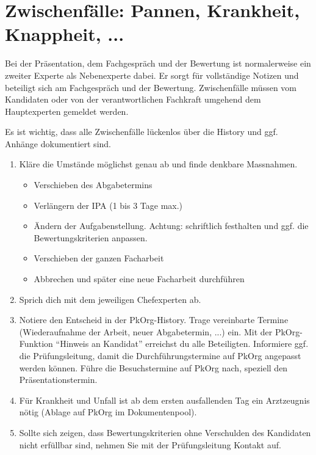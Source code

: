 \chapter{Zwischenfälle: Pannen, Krankheit, Knappheit, ...}
Bei der Präsentation, dem Fachgespräch und der Bewertung ist normalerweise ein zweiter Experte als Nebenexperte dabei. Er sorgt für vollständige Notizen und beteiligt sich am Fachgespräch und der Bewertung. Zwischenfälle müssen vom Kandidaten oder von der verantwortlichen Fachkraft umgehend dem Hauptexperten gemeldet werden.

Es ist wichtig, dass alle Zwischenfälle lückenlos über die History und ggf. Anhänge dokumentiert sind.

\begin{enumerate}
  \item Kläre die Umstände möglichst genau ab und finde denkbare Massnahmen.
  \begin{itemize}
    \item Verschieben des Abgabetermins
    \item Verlängern der IPA (1 bis 3 Tage max.)
    \item Ändern der Aufgabenstellung. Achtung: schriftlich festhalten und ggf. die Bewertungskriterien anpassen.
    \item Verschieben der ganzen Facharbeit
    \item Abbrechen und später eine neue Facharbeit durchführen
  \end{itemize}
  \item Sprich dich mit dem jeweiligen Chefexperten ab.
  \item Notiere den Entscheid in der PkOrg-History. Trage vereinbarte Termine (Wiederaufnahme der Arbeit, neuer Abgabetermin, ...) ein. Mit der PkOrg-Funktion \enquote{Hinweis an Kandidat} erreichst du alle Beteiligten.
  Informiere ggf. die Prüfungsleitung, damit die Durchführungstermine auf PkOrg
  angepasst werden können. Führe die Besuchstermine auf PkOrg nach, speziell den Präsentationstermin.
  \item Für Krankheit und Unfall ist ab dem ersten ausfallenden Tag ein Arztzeugnis nötig (Ablage auf PkOrg im Dokumentenpool).
  \item Sollte sich zeigen, dass Bewertungskriterien ohne Verschulden des Kandidaten nicht erfüllbar sind, nehmen Sie mit der Prüfungsleitung Kontakt auf.
\end{enumerate}

